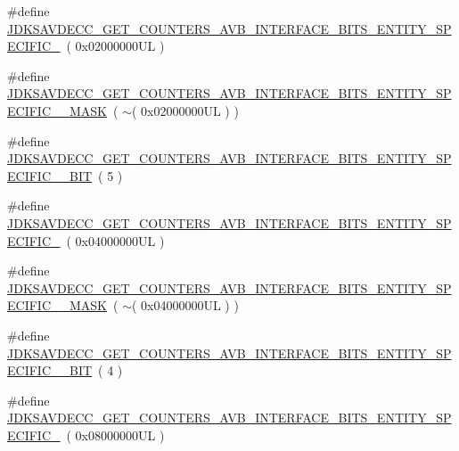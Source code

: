 \begin{DoxyCompactItemize}
\item 
\#define \hyperlink{group__get__counters__avb__interface__bits_ga445352c6feba9a71abfc394e2a9d0950}{J\+D\+K\+S\+A\+V\+D\+E\+C\+C\+\_\+\+G\+E\+T\+\_\+\+C\+O\+U\+N\+T\+E\+R\+S\+\_\+\+A\+V\+B\+\_\+\+I\+N\+T\+E\+R\+F\+A\+C\+E\+\_\+\+B\+I\+T\+S\+\_\+\+E\+N\+T\+I\+T\+Y\+\_\+\+S\+P\+E\+C\+I\+F\+I\+C\+\_}~( 0x02000000\+U\+L )
\item 
\#define \hyperlink{group__get__counters__avb__interface__bits_ga4b62d418dd0f463da1e3e024cd4d6036}{J\+D\+K\+S\+A\+V\+D\+E\+C\+C\+\_\+\+G\+E\+T\+\_\+\+C\+O\+U\+N\+T\+E\+R\+S\+\_\+\+A\+V\+B\+\_\+\+I\+N\+T\+E\+R\+F\+A\+C\+E\+\_\+\+B\+I\+T\+S\+\_\+\+E\+N\+T\+I\+T\+Y\+\_\+\+S\+P\+E\+C\+I\+F\+I\+C\+\_\+\_\+\+M\+A\+SK}~( $\sim$( 0x02000000\+U\+L ) )
\item 
\#define \hyperlink{group__get__counters__avb__interface__bits_ga946c6df82b0905bfbb1ba2d518fa656c}{J\+D\+K\+S\+A\+V\+D\+E\+C\+C\+\_\+\+G\+E\+T\+\_\+\+C\+O\+U\+N\+T\+E\+R\+S\+\_\+\+A\+V\+B\+\_\+\+I\+N\+T\+E\+R\+F\+A\+C\+E\+\_\+\+B\+I\+T\+S\+\_\+\+E\+N\+T\+I\+T\+Y\+\_\+\+S\+P\+E\+C\+I\+F\+I\+C\+\_\+\_\+\+B\+IT}~( 5 )
\item 
\#define \hyperlink{group__get__counters__avb__interface__bits_gaf9dafbc5df8009634cc4d4c604e68ed8}{J\+D\+K\+S\+A\+V\+D\+E\+C\+C\+\_\+\+G\+E\+T\+\_\+\+C\+O\+U\+N\+T\+E\+R\+S\+\_\+\+A\+V\+B\+\_\+\+I\+N\+T\+E\+R\+F\+A\+C\+E\+\_\+\+B\+I\+T\+S\+\_\+\+E\+N\+T\+I\+T\+Y\+\_\+\+S\+P\+E\+C\+I\+F\+I\+C\+\_}~( 0x04000000\+U\+L )
\item 
\#define \hyperlink{group__get__counters__avb__interface__bits_gaa4702641dab60002878559fc3acc7f06}{J\+D\+K\+S\+A\+V\+D\+E\+C\+C\+\_\+\+G\+E\+T\+\_\+\+C\+O\+U\+N\+T\+E\+R\+S\+\_\+\+A\+V\+B\+\_\+\+I\+N\+T\+E\+R\+F\+A\+C\+E\+\_\+\+B\+I\+T\+S\+\_\+\+E\+N\+T\+I\+T\+Y\+\_\+\+S\+P\+E\+C\+I\+F\+I\+C\+\_\+\_\+\+M\+A\+SK}~( $\sim$( 0x04000000\+U\+L ) )
\item 
\#define \hyperlink{group__get__counters__avb__interface__bits_gaa449b345aabd0727274878d9ab46222e}{J\+D\+K\+S\+A\+V\+D\+E\+C\+C\+\_\+\+G\+E\+T\+\_\+\+C\+O\+U\+N\+T\+E\+R\+S\+\_\+\+A\+V\+B\+\_\+\+I\+N\+T\+E\+R\+F\+A\+C\+E\+\_\+\+B\+I\+T\+S\+\_\+\+E\+N\+T\+I\+T\+Y\+\_\+\+S\+P\+E\+C\+I\+F\+I\+C\+\_\+\_\+\+B\+IT}~( 4 )
\item 
\#define \hyperlink{group__get__counters__avb__interface__bits_ga33da7a9b6571b88342257e38c8d5b88b}{J\+D\+K\+S\+A\+V\+D\+E\+C\+C\+\_\+\+G\+E\+T\+\_\+\+C\+O\+U\+N\+T\+E\+R\+S\+\_\+\+A\+V\+B\+\_\+\+I\+N\+T\+E\+R\+F\+A\+C\+E\+\_\+\+B\+I\+T\+S\+\_\+\+E\+N\+T\+I\+T\+Y\+\_\+\+S\+P\+E\+C\+I\+F\+I\+C\+\_}~( 0x08000000\+U\+L )

\end{DoxyCompactItemize}
